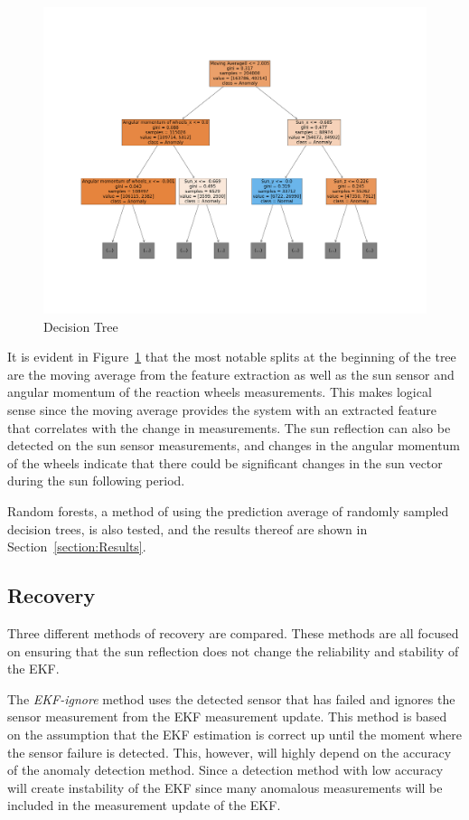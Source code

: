 \documentclass[letterpaper, 10 pt, conference]{ieeeconf}  %
\begin{document}
\begin{figure}[!htb]
	\centering
	\includegraphics[trim = {4cm 8cm 4cm 8cm},clip, width = 15cm]{Figures/DecisionTreeBinaryClass.png}
	\caption{Decision Tree}
	\label{fig:DecisionTree}
\end{figure}

It is evident in Figure~\ref{fig:DecisionTree} that the most notable splits at the beginning of the tree are the moving average from the feature extraction as well as the sun sensor and angular momentum of the reaction wheels measurements. This makes logical sense since the moving average provides the system with an extracted feature that correlates with the change in measurements. The sun reflection can also be detected on the sun sensor measurements, and changes in the angular momentum of the wheels indicate that there could be significant changes in the sun vector during the sun following period.

Random forests, a method of using the prediction average of randomly sampled decision trees, is also tested, and the results thereof are shown in Section~\ref{section:Results}.


\subsection{Recovery}
Three different methods of recovery are compared. These methods are all focused on ensuring that the sun reflection does not change the reliability and stability of the EKF.

The \emph{EKF-ignore} method uses the detected sensor that has failed and ignores the sensor measurement from the EKF measurement update. This method is based on the assumption that the EKF estimation is correct up until the moment where the sensor failure is detected. This, however, will highly depend on the accuracy of the anomaly detection method. Since a detection method with low accuracy will create instability of the EKF since many anomalous measurements will be included in the measurement update of the EKF.
\end{document}
